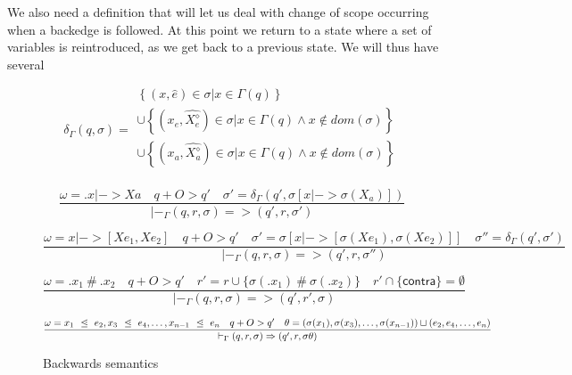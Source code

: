 \documentclass[10pt]{../sigplanconf}
\newcommand{\gen}{\ensuremath{~{\leq\kern-6pt \raisebox{1pt}{$\cdot$}}~}}
\begin{document}
We also need a definition that will let us deal with change of scope
occurring when a backedge is followed. At this point we return to a
state where a set of variables is reintroduced, as we get back to a
previous state. We will thus have several 



\begin{equation}
  \label{eq:delta}
  \delta_\Gamma(q, \sigma) =
  \begin{array}{l}
    \left\{ (x, \widehat{e}) \in \sigma | x \in \Gamma(q) \right\} \\
    \cup
    \left\{ (x_e, \widehat{X_e^\diamond}) \in \sigma \Big| x \in \Gamma(q) \land x \not \in dom(\sigma) \right\} \\
    \cup \left\{ (x_a, \widehat{X_a^\diamond}) \in \sigma \Big| x \in \Gamma(q) \land x \not \in dom(\sigma) \right\} \\
  \end{array}
\end{equation}

\begin{figure*}
  \centering
  \begin{equation*}
    \frac{
      \omega = \texttt{.}x |-> Xa
      \quad q +O> q'
      \quad \sigma' = \delta_\Gamma(q', \sigma[x |-> \sigma(X_a)])
    }
    {
      |-_\Gamma (q, r, \sigma) => (q', r, \sigma')
    }
  \end{equation*}

  \begin{equation*}
    \frac{
      \omega = x |-> [Xe_1, Xe_2]
      \quad q +O> q'
      \quad \sigma' = \sigma[x |-> [\sigma(Xe_1), \sigma(Xe_2)]]
      \quad \sigma'' = \delta_\Gamma(q', \sigma')
    }
    {
      |-_\Gamma (q, r, \sigma) => (q', r, \sigma'')
    }
  \end{equation*}

  \begin{equation*}
    \frac{
      \omega = \texttt{.}x_1\ \#\ \texttt{.}x_2
      \quad q +O> q'
      \quad r' = r \cup \{ \sigma(\texttt{.}x_1)\ \#\ \sigma(\texttt{.}x_2) \}
      \quad r' \cap \{\textsf{contra}\} = \emptyset
    }
    {
      |-_\Gamma (q, r, \sigma) => (q', r', \sigma)
    }
  \end{equation*}

  \begin{equation*}
    \frac{
      \omega = x_1\ \gen\ e_2, x_3\ \gen\ e_4, \ldots, x_{n-1}\ \gen\ e_n
      \quad q +O> q'
      \quad \theta = (\sigma(x_1), \sigma(x_3), \ldots, \sigma(x_{n-1})) 
             \sqcup (e_2, e_4, \ldots, e_{n})
    }
    {
      |-_\Gamma (q, r, \sigma) => (q', r, \sigma\theta)
    }
  \end{equation*}
  \caption{Backwards semantics}
  \label{fig:delta}
\end{figure*}
\end{document}
